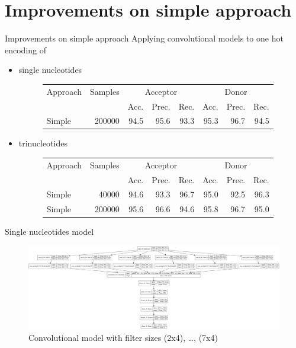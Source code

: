 \documentclass[10pt]{beamer}
\begin{document}
\section{Improvements on simple approach}
\begin{frame}{Improvements on simple approach}
	Applying convolutional models to one hot encoding of
	\begin{itemize}
		\item single nucleotides
		\begin{figure}
			\small
			\centering
			\begingroup
			\def\arraystretch{1.2}
			\begin{tabular}{|l|r|r|r|r|r|r|r|}
				\hline
				Approach  & Samples & \multicolumn{3}{c|}{Acceptor} & \multicolumn{3}{c|}{Donor} \\
				\cline{3-8}
				& & Acc. & Prec. & Rec. & Acc. & Prec. & Rec. \\
				\hline
				Simple & 200000 & 94.5 & 95.6 & 93.3 & 95.3 & 96.7 & 94.5 \\
				
				\hline  
			\end{tabular}
			\endgroup
		\end{figure}
		\item trinucleotides
		\begin{figure}
			\small
			\centering
			\begingroup
			\def\arraystretch{1.2}
			\begin{tabular}{|l|r|r|r|r|r|r|r|}
				\hline
				Approach  & Samples & \multicolumn{3}{c|}{Acceptor} & \multicolumn{3}{c|}{Donor} \\
				\cline{3-8}
				& & Acc. & Prec. & Rec. & Acc. & Prec. & Rec. \\
				\hline
				Simple & 40000 & 94.6 & 93.3 & 96.7 & 95.0 & 92.5 & 96.3 \\
				Simple & 200000 & 95.6 & 96.6 & 94.6 & 95.8 & 96.7 & 95.0\\
				
				\hline  
			\end{tabular}
			\endgroup
		\end{figure}
	\end{itemize}
\end{frame}

\begin{frame}{Single nucleotides model}
	\begin{figure}[ht]
		\centering
		\includegraphics[width = 1.05\textwidth]{../../models/plotted_models/simple_model.png}
		\caption{Convolutional model with filter sizes (2x4), \dots, (7x4)}
	\end{figure}
\end{frame}
\end{document}
